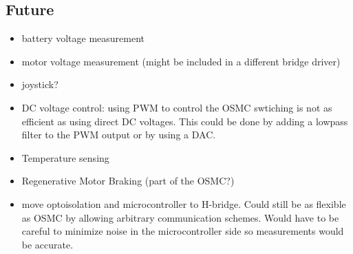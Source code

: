 \documentclass[letterpaper,12pt,notitlepage]{report}
\begin{document}
\subsection{Future}
\begin{itemize}
 \item battery voltage measurement
 \item motor voltage measurement (might be included in a different bridge driver)
 \item joystick?
 \item DC voltage control: using PWM to control the OSMC swtiching is not as efficient as using direct DC voltages.  This could be done by adding a lowpass filter to the PWM output or by using a DAC.
 \item Temperature sensing
 \item Regenerative Motor Braking (part of the OSMC?)
 \item move optoisolation and microcontroller to H-bridge.  Could still be as flexible as OSMC by allowing arbitrary communication schemes.  Would have to be careful to minimize noise in the microcontroller side so measurements would be accurate.
\end{itemize}
\end{document}
